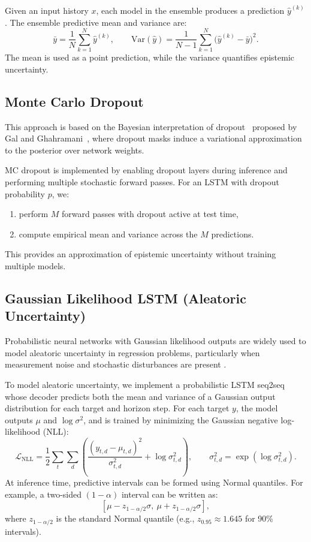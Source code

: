 \documentclass[a4paper,fleqn]{cas-sc}
\begin{document}
Given an input history \(x\), each model in the ensemble produces a prediction \(\hat{y}^{(k)}\). The ensemble predictive mean and variance are:
\[
\bar{y} = \frac{1}{N} \sum_{k=1}^{N} \hat{y}^{(k)}, \qquad
\mathrm{Var}(\hat{y}) = \frac{1}{N-1} \sum_{k=1}^{N} \bigl(\hat{y}^{(k)} - \bar{y}\bigr)^2.
\]
The mean is used as a point prediction, while the variance quantifies epistemic uncertainty.

\subsection{Monte Carlo Dropout}

This approach is based on the Bayesian interpretation of dropout~\cite{srivastava2014dropout} proposed by Gal and Ghahramani~\cite{gal2016dropout}, where dropout masks induce a variational approximation to the posterior over network weights.


MC dropout is implemented by enabling dropout layers during inference and performing multiple stochastic forward passes. For an LSTM with dropout probability \(p\), we:
\begin{enumerate}
    \item perform \(M\) forward passes with dropout active at test time,
    \item compute empirical mean and variance across the \(M\) predictions.
\end{enumerate}
This provides an approximation of epistemic uncertainty without training multiple models.


\subsection{Gaussian Likelihood LSTM (Aleatoric Uncertainty)}
\label{sec:gaussian-method}

Probabilistic neural networks with Gaussian likelihood outputs are widely used to model aleatoric uncertainty in regression problems, particularly when measurement noise and stochastic disturbances are present \cite{ovadia2019can}.


To model aleatoric uncertainty, we implement a probabilistic LSTM seq2seq whose decoder predicts both the mean and variance of a Gaussian output distribution for each target and horizon step. For each target \(y\), the model outputs \(\mu\) and \(\log \sigma^2\), and is trained by minimizing the Gaussian negative log-likelihood (NLL):
\[
\mathcal{L}_{\mathrm{NLL}} =
\frac{1}{2}\sum_{t}\sum_{d}
\left(
\frac{(y_{t,d}-\mu_{t,d})^2}{\sigma_{t,d}^2} + \log \sigma_{t,d}^2
\right),
\qquad \sigma_{t,d}^2 = \exp(\log \sigma_{t,d}^2).
\]
At inference time, predictive intervals can be formed using Normal quantiles. For example, a two-sided \((1-\alpha)\) interval can be written as:
\[
[\mu - z_{1-\alpha/2}\sigma,\ \mu + z_{1-\alpha/2}\sigma],
\]
where \(z_{1-\alpha/2}\) is the standard Normal quantile (e.g., \(z_{0.95}\approx 1.645\) for 90\% intervals).
\end{document}
